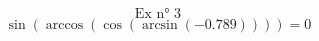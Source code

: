 \documentclass{article}
\begin{document}
\[ \text{Ex n° 3} \]
\[ \sin(\arccos(\cos(\arcsin(-0.789)))) = 0 \]
\end{document}
